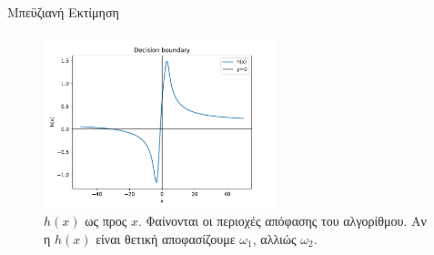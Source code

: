 \documentclass{beamer}
\begin{document}
\begin{frame}{Μπεϋζιανή Εκτίμηση}
    \begin{figure}
        \centering
            \includegraphics[width=0.6\textwidth]{../plots/DB2.pdf}
            \caption{$h(x)$ ως προς $x$. Φαίνονται οι περιοχές απόφασης του αλγορίθμου. Αν 
            η $h(x)$ είναι θετική αποφασίζουμε $\omega_1$, αλλιώς $\omega_2$.}
            \label{fig:DB2}
    \end{figure}

    
\end{frame}
\end{document}
